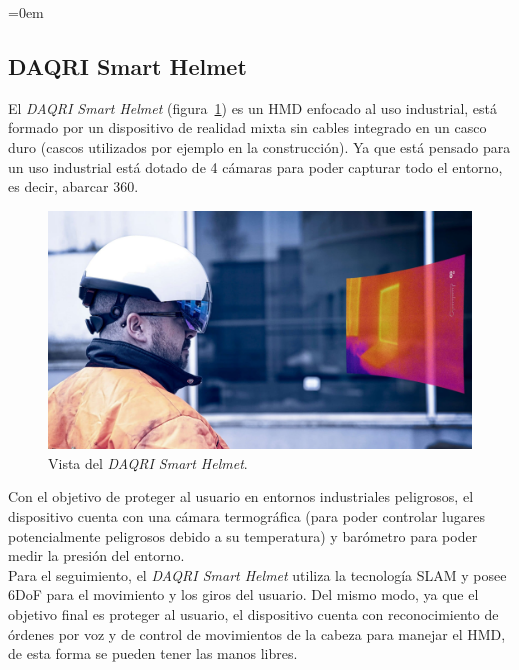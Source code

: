 \parindent=0em
\subsection{DAQRI Smart Helmet}
\label{subsec:DAQRISMART}
\noindent


El \textit{DAQRI Smart Helmet} (figura~\ref{fig:vistaDAQRIHelmet}) es un HMD enfocado al uso industrial, está formado por un dispositivo de realidad mixta sin cables integrado en un casco duro (cascos utilizados por ejemplo en la construcción). Ya que está pensado para un uso industrial está dotado de 4 cámaras para poder capturar todo el entorno, es decir, abarcar 360\degree .\\

\begin{figure}[H]
    \centering
    \includegraphics[scale=0.12]{Images/Estado del arte/daqrihelmet.jpg}
    \caption[Vista del \textit{DAQRI Smart Helmet}]{Vista del \textit{DAQRI Smart Helmet}\footnotemark.}
    \label{fig:vistaDAQRIHelmet}
\end{figure}



Con el objetivo de proteger al usuario en entornos industriales peligrosos, el dispositivo cuenta con una cámara termográfica (para poder controlar lugares potencialmente peligrosos debido a su temperatura) y barómetro para poder medir la presión del entorno.\\

Para el seguimiento, el \textit{DAQRI Smart Helmet} utiliza la tecnología SLAM y posee 6DoF para el movimiento y los giros del usuario. Del mismo modo, ya que el objetivo final es proteger al usuario, el dispositivo cuenta con reconocimiento de órdenes por voz y de control de movimientos de la cabeza para manejar el HMD, de esta forma se pueden tener las manos libres.\\


